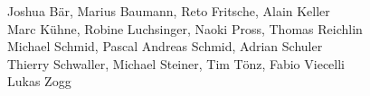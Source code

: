 %
%
%

Joshua Bär,                      %
Marius Baumann,                   %
Reto Fritsche,                    %
Alain Keller%
\\
Marc Kühne,			  %
Robine Luchsinger,                %
Naoki Pross,                      %
Thomas Reichlin%
\\
Michael Schmid,                    %
Pascal Andreas Schmid,            %
Adrian Schuler%
\\
Thierry Schwaller,                %
Michael Steiner,                  %
Tim Tönz,                         %
Fabio Viecelli%
\\
Lukas Zogg%
